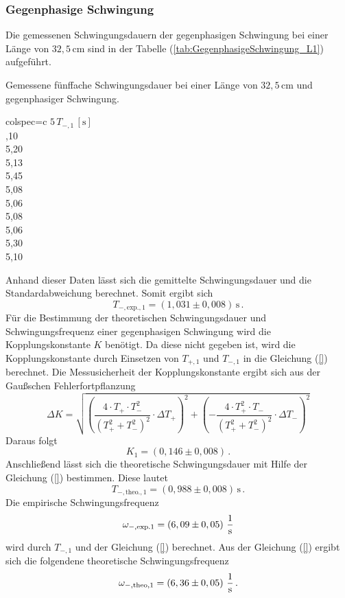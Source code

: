 \subsubsection{Gegenphasige Schwingung}
\label{sec:GegenphasigeSchwingung_KurzelPendel}
Die gemessenen Schwingungsdauern der gegenphasigen Schwingung bei einer Länge von $32,5\, \unit{\centi\meter}$ sind 
in der Tabelle (\ref{tab:GegenphasigeSchwingung_L1}) aufgeführt. 
\begin{table}[H]
  \centering
  \caption{Gemessene fünffache Schwingungsdauer bei einer Länge von $32,5\, \unit{\centi\meter}$ und gegenphasiger Schwingung.}
  \label{tab:GegenphasigeSchwingung_L1}
  \begin{tblr}{colspec={c}}
      \toprule
      $5\, T_{-, 1}\,\left[\unit{\second}\right]$\\
      ,10 \\
      5,20 \\
      5,13 \\
      5,45 \\
      5,08 \\
      5,06 \\
      5,08 \\
      5,06 \\
      5,30 \\
      5,10 \\
      \bottomrule
  \end{tblr}
\end{table}
Anhand dieser Daten lässt sich die gemittelte Schwingungsdauer und die Standardabweichung berechnet. Somit ergibt sich
$$T_{-,\text{exp.}, 1} = \left(1,031 \pm 0,008 \right)\, \unit{\second}\,.$$ 
Für die Bestimmung der theoretischen Schwingungsdauer und Schwingungsfrequenz einer gegenphasigen Schwingung wird die Kopplungskonstante $K$ benötigt. Da
diese nicht gegeben ist, wird die Kopplungskonstante durch Einsetzen von $T_{+,1}$ und $T_{-,1}$ in die Gleichung (\ref{}) berechnet. Die Messusicherheit der Kopplungskonstante
ergibt sich aus der Gaußschen Fehlerfortpflanzung
$$\Delta K = \sqrt{\left(\frac{4 \cdot T_+\cdot T_{-}^{2}}{\left(T_{+}^{2} + T_{-}^{2}\right)^{2}}\cdot \Delta T_+\right)^{2}+ \left(-\frac{4\cdot T_{+}^{2}\cdot T_{-}}{\left(T_{+}^{2} + T_{-}^{2}\right)^{2}} \cdot \Delta T_{-}\right)^2}$$
Daraus folgt
$$K_1 = \left( 0,146 \pm 0,008 \right)\,.$$
Anschließend lässt sich die theoretische Schwingungsdauer mit Hilfe der Gleichung (\ref{}) bestimmen. Diese lautet
$$T_{-,\text{theo.},1} = \left( 0,988 \pm 0,008 \right)\, \unit{\second}\,.$$
Die empirische Schwingungsfrequenz 
$$\omega_{-,\text{exp.}1} = \left( 6,09 \pm 0,05 \right)\, \unit[per-mode=fraction]{\per \second}$$ wird durch $T_{-,1}$ und der Gleichung (\ref{})
berechnet. Aus der Gleichung (\ref{}) ergibt sich die folgendene theoretische Schwingungsfrequenz
$$\omega_{-,\text{theo},1} = \left( 6,36 \pm 0,05 \right)\,\unit[per-mode=fraction]{\per \second}\,.$$
%
%
